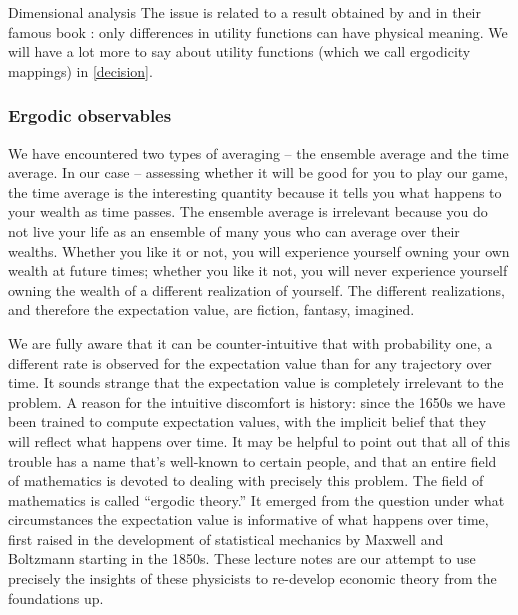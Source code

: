 \begin{excursion}{Dimensional analysis}
The issue is related to a result obtained by  and 
 in their 
famous
book \cite{vonNeumannMorgenstern1944}: 
only differences in utility functions can have physical meaning. 
We will have a lot more to say about utility functions (which we call ergodicity mappings) in \cref{decision}.
\end{excursion}

\subsubsection{Ergodic observables}

We have encountered two types of averaging -- the ensemble average and the
time average. In our case -- assessing whether it will be good for you to play our 
game, the time average is the interesting quantity because it tells you what happens
to your wealth as time passes. The ensemble average is irrelevant 
because you do not live your life as an ensemble of many yous who can average
over their wealths. Whether you like it or not, you will experience yourself owning 
your own wealth at future times; whether you like it not, you will never experience
yourself owning the wealth of a different realization of yourself. The different realizations,
and therefore the expectation value, are fiction, fantasy, imagined.

We are fully aware that it can be counter-intuitive that with probability one, a different
rate is observed for the expectation value than for any trajectory over time. It sounds
strange that the expectation value is completely irrelevant to the problem. A reason
for the intuitive discomfort is history: since the 1650s we have been trained to
compute expectation values, with the implicit belief that they will reflect what happens
over time. It may be helpful to point out that all of this trouble has a name that's well-known
to certain people, and that an entire field of mathematics is devoted to dealing with
precisely this problem. The field of mathematics is called ``ergodic theory.'' It emerged
from the question under what circumstances the expectation value is informative 
of what happens over time, first raised in the development of statistical mechanics by Maxwell and 
Boltzmann starting in the 1850s. These lecture notes are our attempt to use precisely the insights of these physicists to re-develop economic theory from the foundations up.

